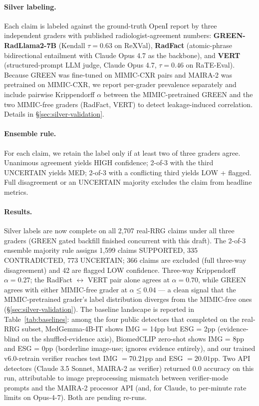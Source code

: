 \documentclass[pmlr]{jmlr}
\begin{document}
\paragraph{Silver labeling.} Each claim is labeled against the ground-truth OpenI report by three independent graders with published radiologist-agreement numbers: \textbf{GREEN-RadLlama2-7B} \citep{ostmeier2024green} (Kendall $\tau = 0.63$ on ReXVal), \textbf{RadFact} \citep{bannur2024maira2} (atomic-phrase bidirectional entailment with Claude Opus 4.7 as the backbone), and \textbf{VERT} \citep{tang2026vert} (structured-prompt LLM judge, Claude Opus 4.7, $\tau = 0.46$ on RaTE-Eval). Because GREEN was fine-tuned on MIMIC-CXR pairs and MAIRA-2 was pretrained on MIMIC-CXR, we report per-grader prevalence separately and include pairwise Krippendorff $\alpha$ between the MIMIC-pretrained GREEN and the two MIMIC-free graders (RadFact, VERT) to detect leakage-induced correlation. Details in \S\ref{sec:silver-validation}.

\paragraph{Ensemble rule.} For each claim, we retain the label only if at least two of three graders agree. Unanimous agreement yields \textsc{HIGH} confidence; 2-of-3 with the third \textsc{UNCERTAIN} yields \textsc{MED}; 2-of-3 with a conflicting third yields \textsc{LOW} + flagged. Full disagreement or an \textsc{UNCERTAIN} majority excludes the claim from headline metrics.

\paragraph{Results.} Silver labels are now complete on all 2{,}707 real-RRG claims under all three graders (GREEN gated backfill finished concurrent with this draft). The 2-of-3 ensemble majority rule assigns 1{,}599 claims \textsc{SUPPORTED}, 335 \textsc{CONTRADICTED}, 773 \textsc{UNCERTAIN}; 366 claims are excluded (full three-way disagreement) and 42 are flagged \textsc{LOW} confidence. Three-way Krippendorff $\alpha = 0.27$; the RadFact $\leftrightarrow$ VERT pair alone agrees at $\alpha = 0.70$, while GREEN agrees with either MIMIC-free grader at $\alpha \le 0.04$ — a clean signal that the MIMIC-pretrained grader's label distribution diverges from the MIMIC-free ones (§\ref{sec:silver-validation}). The baseline landscape is reported in Table~\ref{tab:baselines}: among the four public detectors that completed on the real-RRG subset, MedGemma-4B-IT shows IMG = 14pp but ESG = 2pp (evidence-blind on the shuffled-evidence axis), BiomedCLIP zero-shot shows IMG = 8pp and ESG = 0pp (borderline image-use; ignores evidence entirely), and our trained v6.0-retrain verifier reaches test IMG $=70.21$pp and ESG $=20.01$pp. Two API detectors (Claude 3.5 Sonnet, MAIRA-2 as verifier) returned 0.0 accuracy on this run, attributable to image preprocessing mismatch between verifier-mode prompts and the MAIRA-2 processor API (and, for Claude, to per-minute rate limits on Opus-4-7). Both are pending re-runs.
\end{document}
